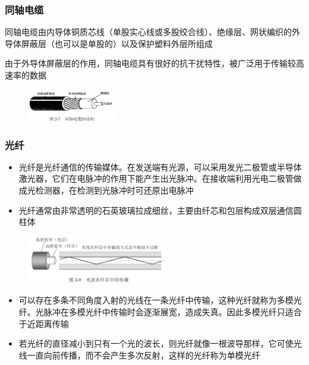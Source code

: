 \documentclass[cs4size,a4paper,10pt]{ctexart}
\begin{document}
	\subsubsection{同轴电缆}
	同轴电缆由内导体铜质芯线（单股实心线或多股绞合线）、绝缘层、网状编织的外导体屏蔽层（也可以是单股的）以及保护塑料外层所组成

	由于外导体屏蔽层的作用，同轴电缆具有很好的抗干扰特性，被广泛用于传输较高速率的数据

	\begin{figure}[H]
		\centering
		\includegraphics[width=0.35\textwidth]{img/2.7}
	\end{figure}

	\subsubsection{光纤}
	\begin{itemize}
		\item 光纤是光纤通信的传输媒体。在发送端有光源，可以采用发光二极管或半导体激光器，它们在电脉冲的作用下能产生出光脉冲。在接收端利用光电二极管做成光检测器，在检测到光脉冲时可还原出电脉冲
		\item 光纤通常由非常透明的石英玻璃拉成细丝，主要由纤芯和包层构成双层通信圆柱体
	\end{itemize}

	\begin{figure}[H]
		\centering
		\includegraphics[width=0.55\textwidth]{img/2.9}
	\end{figure}

	\begin{itemize}
		\item 可以存在多条不同角度入射的光线在一条光纤中传输，这种光纤就称为多模光纤。光脉冲在多模光纤中传输时会逐渐展宽，造成失真。因此多模光纤只适合于近距离传输
		\item 若光纤的直径减小到只有一个光的波长，则光纤就像一根波导那样，它可使光线一直向前传播，而不会产生多次反射，这样的光纤称为单模光纤
	\end{itemize}
\end{document}
